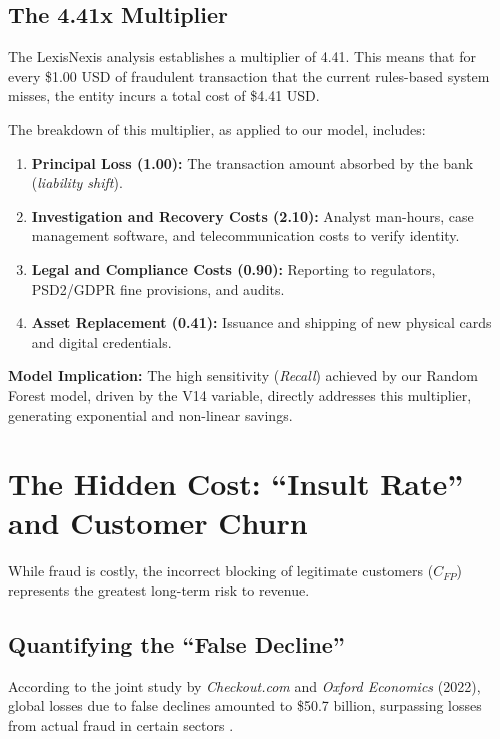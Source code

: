 \documentclass[12pt,a4paper]{report}
\begin{document}
\subsection{The 4.41x Multiplier}

The LexisNexis analysis establishes a multiplier of 4.41. This means that for every \$1.00 USD of fraudulent transaction that the current rules-based system misses, the entity incurs a total cost of \$4.41 USD.

The breakdown of this multiplier, as applied to our model, includes:

\begin{enumerate}
    \item \textbf{Principal Loss (1.00):} The transaction amount absorbed by the bank (\textit{liability shift}).
    \item \textbf{Investigation and Recovery Costs (2.10):} Analyst man-hours, case management software, and telecommunication costs to verify identity.
    \item \textbf{Legal and Compliance Costs (0.90):} Reporting to regulators, PSD2/GDPR fine provisions, and audits.
    \item \textbf{Asset Replacement (0.41):} Issuance and shipping of new physical cards and digital credentials.
\end{enumerate}

\textbf{Model Implication:} The high sensitivity (\textit{Recall}) achieved by our Random Forest model, driven by the V14 variable, directly addresses this multiplier, generating exponential and non-linear savings.

\section{The Hidden Cost: \textquotedblleft Insult Rate\textquotedblright{} and Customer Churn}

While fraud is costly, the incorrect blocking of legitimate customers (\(C_{FP}\)) represents the greatest long-term risk to revenue.

\subsection{Quantifying the \textquotedblleft False Decline\textquotedblright}

According to the joint study by \textit{Checkout.com} and \textit{Oxford Economics} (2022), global losses due to false declines amounted to \$50.7 billion, surpassing losses from actual fraud in certain sectors \cite{oxford2022}.
\end{document}
